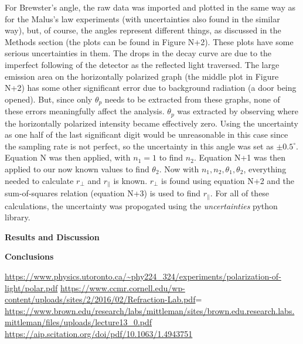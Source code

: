 \documentclass[11pt]{article}
\begin{document}
\begin{multicols}{2}
    For Brewster's angle, the raw data was imported and plotted in the same way as for the Malus's law experiments (with uncertainties also found in the similar way), but, of course, the angles represent different things, as discussed in the Methods section (the plots can be found in Figure N+2).
    These plots have some serious uncertainties in them. The drops in the decay curve are due to the imperfect following of the detector as the reflected light traversed.
    The large emission area on the horizontally polarized graph (the middle plot in Figure N+2) has some other significant error due to background radiation (a door being opened).
    But, since only $\theta_p$ needs to be extracted from these graphs, none of these errors meaningfully affect the analysis.
    $\theta_p$ was extracted by observing where the horizontally polarized intensity became effectively zero.
    Using the uncertainty as one half of the last significant digit would be unreasonable in this case since the sampling rate is not perfect, so the uncertainty in this angle was set as $\pm 0.5 ^\circ$. Equation N was then applied, with $n_1 = 1$ to find $n_2$. Equation N+1 was then applied to our now known values to find $\theta_2$. Now with $n_1, n_2, \theta_1, \theta_2$, everything needed to calculate $r_\perp$ and $r_\parallel$ is known. $r_\perp$ is found using equation N+2 and the sum-of-squares relation (equation N+3) is used to find $r_\parallel$. For all of these calculations, the uncertainty was propogated using the \textit{uncertainties} python library.

    \vspace{10pt}

     \selectfont \textbf{Results and Discussion}
    
     \selectfont 




    \vspace{10pt}

     \selectfont \textbf{Conclusions}
    
     \selectfont 




\end{multicols}

    \vspace{10pt}
     
     \selectfont

    \begin{thebibliography}{} \selectfont
        \url{https://www.physics.utoronto.ca/~phy224_324/experiments/polarization-of-light/polar.pdf}
        \url{https://www.ccmr.cornell.edu/wp-content/uploads/sites/2/2016/02/Refraction-Lab.pdf}=
        \url{https://www.brown.edu/research/labs/mittleman/sites/brown.edu.research.labs.mittleman/files/uploads/lecture13_0.pdf}
        \url{https://aip.scitation.org/doi/pdf/10.1063/1.4943751}
    \end{thebibliography}
\end{document}
